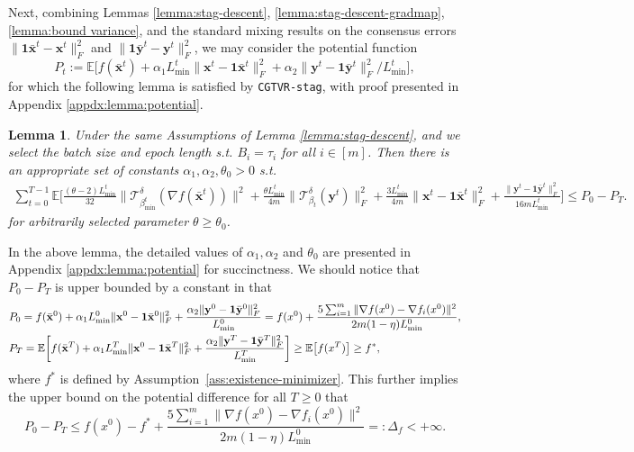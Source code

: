 \documentclass{article}
\newtheorem{lemma}[theorem]{Lemma}
\newcommand{\cT}{\mathcal{T}}
\newcommand{\ctdb}{\mathcal{T}^\delta_{\beta_t}}
\newcommand{\bxt}{\mathbf{x}^t}
\newcommand{\byt}{\mathbf{y}^t}
\newcommand{\bbxt}{\bar{\mathbf{x}}^t}
\newcommand{\bbyt}{\bar{\mathbf{y}}^t}
\newcommand{\EE}{\mathbb{E}}
\newcommand{\bone}{\mathbf{1}}
\begin{document}
Next, combining Lemmas \ref{lemma:stag-descent}, \ref{lemma:stag-descent-gradmap}, \ref{lemma:bound variance}, and the standard mixing results on the consensus errors $\|\bone\bbxt-\bxt\|^2_F$ and $\|\bone\bbyt-\byt\|^2_F$, we may consider the potential function 
\[
P_t := \mathbb{E}\Big[f(\bar{\mathbf{x}}^{t}) + \alpha_1 L_{\min}^t\big\|\mathbf{x}^t - \mathbf{1} \bar{\mathbf{x}}^t\big\|_F^2 + {\alpha_2}\big\|\mathbf{y}^t - \mathbf{1} \bar{\mathbf{y}}^t\big\|_F^2/{L_{\min}^t}\Big],
\]
for which the following lemma is satisfied by \texttt{CGTVR-stag}, with proof presented in Appendix \ref{appdx:lemma:potential}.
\begin{lemma}
\label{lemma: potential descent 2}
Under the same Assumptions of Lemma \ref{lemma:stag-descent}, and we select the batch size and epoch length s.t. $B_i = \tau_i$ for all $i\in[m]$. Then there is an appropriate set of constants $\alpha_1, \alpha_2, \theta_0>0$ s.t. 
\begin{align}
\sum_{t=0}^{T-1}\!\EE\bigg[\!\frac{(\theta\!-\!2)L_{\min}^t}{32}\big\|\cT_{\!\beta_{\min}^t}^\delta\!\!(\nabla f(\bbxt))\big\|^2 \!+\! \frac{\theta L_{\min}^t}{4m}\big\|\ctdb\!(\byt)\big\|_F^2 \!+\! \frac{3L_{\min}^t}{4m}\|\bxt\!-\!\bone\bbxt\|_F^2\!+\!\frac{\|\byt\!-\!\bone\bbyt\|_F^2}{16mL_{\min}^t}\bigg] \!\leq P_0\!-\!P_T\nonumber.
\end{align}
for arbitrarily selected parameter $\theta\geq\theta_0$. 
\end{lemma}
\noindent In the above lemma, the detailed values of $\alpha_1,\alpha_2$ and $\theta_0$ are presented in Appendix \ref{appdx:lemma:potential} for succinctness. We should notice that $P_0-P_T$ is upper bounded by a constant in that   
\begin{align*}
&P_0 = f(\bar{\bf x}^0) + \alpha_1L_{\min}^0\|{\bf x}^0-\bone\bar{\bf x}^0\|^2_F + \frac{\alpha_2\|{\bf y}^0-\bone\bar{\bf y}^0\|^2_F}{L_{\min}^0} = f(x^0) + \frac{5\sum_{i=1}^m\|\nabla f(x^0)-\nabla f_i(x^0)\|^2}{2m(1-\eta)L_{\min}^0},\\
&P_T = \mathbb{E}\bigg[f(\bar{\bf x}^T) + \alpha_1L_{\min}^T\|{\bf x}^0-\bone\bar{\bf x}^T\|^2_F + \frac{\alpha_2\|{\bf y}^T-\bone\bar{\bf y}^T\|^2_F}{L_{\min}^T}\bigg] \geq \mathbb{E}\big[f(x^T)\big]\geq f^*, 
\end{align*}  
where $f^*$ is defined by Assumption~\ref{ass:existence-minimizer}. This further implies the upper bound on the potential difference for all $T\geq0$ that
\begin{equation}
\label{defn:Delta_f}
P_0-P_T\leq f(x^0) - f^* + \frac{5\sum_{i=1}^m\|\nabla f(x^0)-\nabla f_i(x^0)\|^2}{2m(1-\eta)L_{\min}^0}=:\Delta_f<+\infty.
\end{equation}
\end{document}
